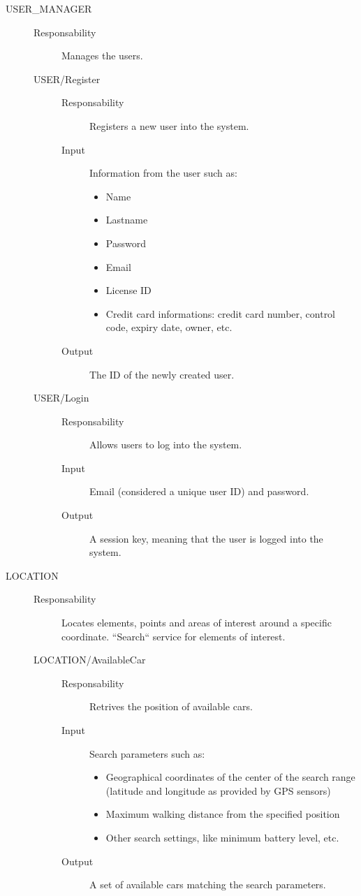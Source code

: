 \documentclass[11pt]{article} %
\begin{document}
\begin{description}
	\item[USER\_MANAGER] \hfill
	\begin{description}
		\item[Responsability] Manages the users.
	\item[USER/Register] \hfill
		\begin{description}
			\item[Responsability] Registers a new user into the system.
			\item[Input] Information from the user such as:
				\begin{itemize}
					\item Name
					\item Lastname
					\item Password
					\item Email
					\item License ID
					\item Credit card informations: credit card number, control code, expiry date, owner, etc.
				\end{itemize}
			\item[Output] The ID of the newly created user.
		\end{description}
	\item[USER/Login] \hfill
		\begin{description}
			\item[Responsability] Allows users to log into the system.
			\item[Input] Email (considered a unique user ID) and password.
			\item[Output] A session key, meaning that the user is logged into the system.
		\end{description}
	\end{description}
	
	\item[LOCATION] \hfill
	\begin{description}
		\item[Responsability] Locates elements, points and areas of interest around a specific coordinate. ``Search`` service for elements of interest.
	\item[LOCATION/AvailableCar] \hfill
		\begin{description}
			\item[Responsability] Retrives the position of available cars.
			\item[Input] Search parameters such as:
			\begin{itemize}
				\item Geographical coordinates of the center of the search range (latitude and longitude as provided by GPS sensors) 
				\item Maximum walking distance from the specified position
				\item Other search settings, like minimum battery level, etc.
			\end{itemize}
			\item[Output] A set of available cars matching the search parameters.
		\end{description}


\end{description}
\end{description}
\end{document}
